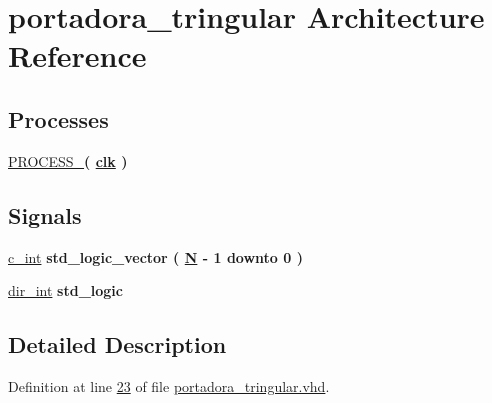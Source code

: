 \hypertarget{classportadora__tringular_1_1portadora__tringular}{}\section{portadora\+\_\+tringular Architecture Reference}
\label{classportadora__tringular_1_1portadora__tringular}
\subsection*{Processes}
 \begin{DoxyCompactItemize}
\item 
\hyperlink{classportadora__tringular_1_1portadora__tringular_a9d3814991b9352ab295cc62784226977}{P\+R\+O\+C\+E\+S\+S\+\_}{\bfseries  ( {\bfseries {\bfseries \hyperlink{classportadora__tringular_a4a4609c199d30b3adebbeb3a01276ec5}{clk}} \textcolor{vhdlchar}{ }} )}
\end{DoxyCompactItemize}
\subsection*{Signals}
 \begin{DoxyCompactItemize}
\item 
\hyperlink{classportadora__tringular_1_1portadora__tringular_ae3b6c46c82d8260487d5f5291a70a96a}{c\+\_\+int} {\bfseries \textcolor{comment}{std\+\_\+logic\+\_\+vector}\textcolor{vhdlchar}{ }\textcolor{vhdlchar}{(}\textcolor{vhdlchar}{ }\textcolor{vhdlchar}{ }\textcolor{vhdlchar}{ }\textcolor{vhdlchar}{ }{\bfseries \hyperlink{classportadora__tringular_af8ee6f7e8fea0e211d86d8e3fd6f8d29}{N}} \textcolor{vhdlchar}{-\/}\textcolor{vhdlchar}{ } \textcolor{vhdldigit}{1} \textcolor{vhdlchar}{ }\textcolor{keywordflow}{downto}\textcolor{vhdlchar}{ }\textcolor{vhdlchar}{ } \textcolor{vhdldigit}{0} \textcolor{vhdlchar}{ }\textcolor{vhdlchar}{)}\textcolor{vhdlchar}{ }} 
\item 
\hyperlink{classportadora__tringular_1_1portadora__tringular_ae27566c74fe97a2b3c215e94dc35dd47}{dir\+\_\+int} {\bfseries \textcolor{comment}{std\+\_\+logic}\textcolor{vhdlchar}{ }} 
\end{DoxyCompactItemize}


\subsection{Detailed Description}


Definition at line \hyperlink{portadora__tringular_8vhd_source_l00023}{23} of file \hyperlink{portadora__tringular_8vhd_source}{portadora\+\_\+tringular.\+vhd}.



